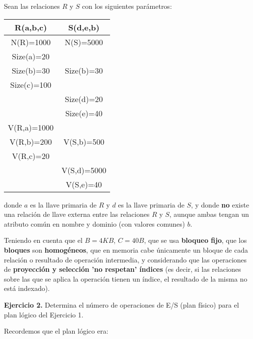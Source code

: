 \documentclass[12pt]{report}
\begin{document}
Sean las relaciones $R$ y $S$ con los siguientes parámetros:

\begin{center}
\begin{tabular}{|c|c|}
\hline 
R(a,b,c) & S(d,e,b) \\ 
\hline 
N(R)=1000 & N(S)=5000 \\ 
\hline 
Size(a)=20 &   \\ 
\hline 
Size(b)=30 & Size(b)=30 \\ 
\hline 
Size(c)=100 &   \\ 
\hline 
  & Size(d)=20 \\ 
\hline 
  & Size(e)=40 \\ 
\hline 
V(R,a)=1000 &   \\ 
\hline 
V(R,b)=200 & V(S,b)=500 \\ 
\hline 
V(R,c)=20 &   \\ 
\hline 
  & V(S,d)=5000 \\ 
\hline 
  & V(S,e)=40 \\ 
\hline 
\end{tabular} 
\end{center}
donde $a$ es la llave primaria de $R$ y $d$ es la llave primaria de $S$, y donde \textbf{no} existe una relación de llave externa entre las relaciones $R$ y $S$, aunque ambas tengan un atributo común en nombre y dominio (con valores comunes) $b$.

Teniendo en cuenta que el $B=4KB$, $C=40B$, que se usa \textbf{bloqueo fijo}, que los \textbf{bloques} son \textbf{homogéneos}, que en memoria cabe únicamente un bloque de cada relación o resultado de operación intermedia, y considerando que las operaciones de \textbf{proyección y selección 'no respetan' índices} (es decir, si las relaciones sobre las que se aplica la operación tienen un índice, el resultado de la misma no está indexado).

\textbf{Ejercicio 2.} Determina el número de operaciones de E/S (plan físico) para el plan lógico del Ejercicio 1.

Recordemos que el plan lógico era:

\begin{center}
\end{center}
\end{document}
